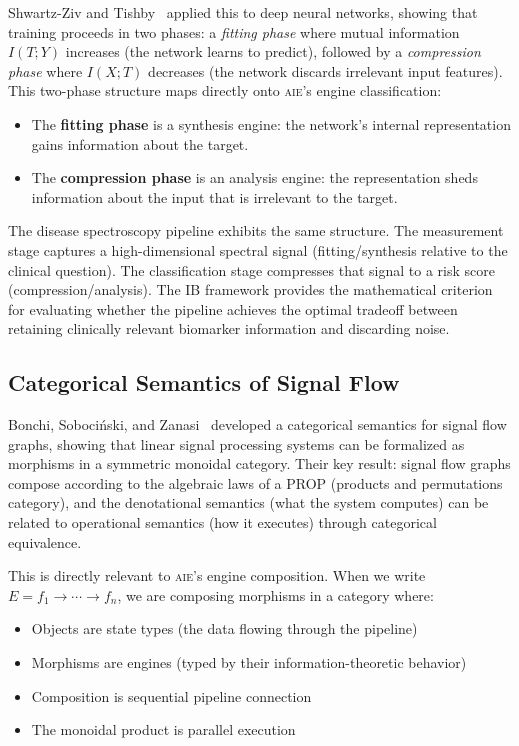 \documentclass[11pt,letterpaper]{article}
\newcommand{\aie}{\textsc{aie}}
\begin{document}
Shwartz-Ziv and Tishby~\cite{shwartzziv2017} applied this to deep neural networks, showing that training proceeds in two phases: a \textit{fitting phase} where mutual information $I(T; Y)$ increases (the network learns to predict), followed by a \textit{compression phase} where $I(X; T)$ decreases (the network discards irrelevant input features). This two-phase structure maps directly onto \aie{}'s engine classification:

\begin{itemize}[leftmargin=*]
  \item The \textbf{fitting phase} is a synthesis engine: the network's internal representation gains information about the target.
  \item The \textbf{compression phase} is an analysis engine: the representation sheds information about the input that is irrelevant to the target.
\end{itemize}

The disease spectroscopy pipeline exhibits the same structure. The measurement stage captures a high-dimensional spectral signal (fitting/synthesis relative to the clinical question). The classification stage compresses that signal to a risk score (compression/analysis). The IB framework provides the mathematical criterion for evaluating whether the pipeline achieves the optimal tradeoff between retaining clinically relevant biomarker information and discarding noise.

\subsection{Categorical Semantics of Signal Flow}

Bonchi, Soboci\'{n}ski, and Zanasi~\cite{bonchi2014} developed a categorical semantics for signal flow graphs, showing that linear signal processing systems can be formalized as morphisms in a symmetric monoidal category. Their key result: signal flow graphs compose according to the algebraic laws of a PROP (products and permutations category), and the denotational semantics (what the system computes) can be related to operational semantics (how it executes) through categorical equivalence.

This is directly relevant to \aie{}'s engine composition. When we write $E = f_1 \rightarrow \cdots \rightarrow f_n$, we are composing morphisms in a category where:
\begin{itemize}[leftmargin=*]
  \item Objects are state types (the data flowing through the pipeline)
  \item Morphisms are engines (typed by their information-theoretic behavior)
  \item Composition is sequential pipeline connection
  \item The monoidal product is parallel execution
\end{itemize}
\end{document}
